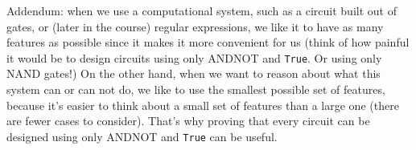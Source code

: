 Addendum: when we use a computational system, such as a circuit built out of gates, or (later in the course) regular expressions, we like it to have as many features as possible since it makes it more convenient for us (think of how painful it would be to design circuits using only ANDNOT and \texttt {True}. Or using only NAND gates!) On the other hand, when we want to reason about what this system can or can not do, we like to use the smallest possible set of features, because it's easier to think about a small set of features than a large one (there are fewer cases to consider). That's why proving that every circuit can be designed using only ANDNOT and \texttt {True} can be useful.